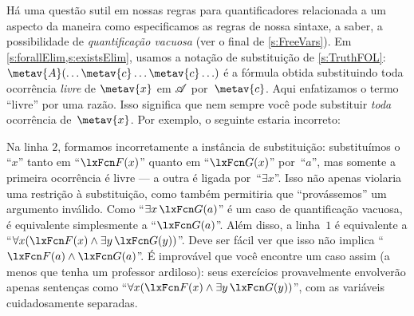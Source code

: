 Há uma questão sutil em nossas regras para quantificadores relacionada a um
aspecto da maneira como especificamos as regras de nossa sintaxe, a saber,
a possibilidade de \emph{quantificação vacuosa} (ver o final de
\cref{s:FreeVars}). Em \cref{s:forallElim,s:existsElim}, usamos
a notação de substituição de \cref{s:TruthFOL}: $\metav{A}(\ldots
\metav{c} \ldots \metav{c} \ldots)$ é a fórmula obtida
substituindo toda ocorrência \emph{livre} de $\metav{x}$ em $\mathscr{A}$
por~$\metav{c}$. Aqui enfatizamos o termo \textquotedblleft livre\textquotedblright{} por uma razão. Isso significa
que nem sempre você pode substituir \emph{toda} ocorrência de~$\metav{x}$.
Por exemplo, o seguinte estaria incorreto:
\begin{fitchproof}
	\PR
	\ifHTMLtarget
\else
\fi
\end{fitchproof}
Na linha $2$, formamos incorretamente a instância de substituição:
substituímos o \textquotedblleft $x$\textquotedblright{} tanto em \textquotedblleft $\atom{F}{x}$\textquotedblright{} quanto em \textquotedblleft $\atom{G}{x}$\textquotedblright{}
por~\textquotedblleft $a$\textquotedblright{}, mas somente a primeira ocorrência é livre — a outra
é ligada por~\textquotedblleft $\exists x$\textquotedblright{}. Isso não apenas violaria uma restrição
à substituição, como também permitiria que \textquotedblleft provássemos\textquotedblright{} um argumento inválido.
Como \textquotedblleft $\exists x\,\atom{G}{a}$\textquotedblright{} é um caso de quantificação vacuosa,
é equivalente simplesmente a \textquotedblleft $\atom{G}{a}$\textquotedblright{}. Além disso, a linha~$1$ é
equivalente a \textquotedblleft $\forall x(\atom{F}{x} \land \exists y\,\atom{G}{y})$\textquotedblright{}.
Deve ser fácil ver que isso não implica \textquotedblleft $\atom{F}{a} \land
\atom{G}{a}$\textquotedblright{}. É improvável que você encontre um caso assim (a menos que
tenha um professor ardiloso): seus exercícios provavelmente envolverão apenas
sentenças como \textquotedblleft $\forall x(\atom{F}{x} \land \exists
y\,\atom{G}{y})$\textquotedblright{}, com as variáveis cuidadosamente separadas.


